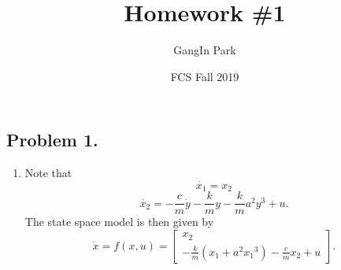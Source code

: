 \documentclass{article}
\title{Homework \#1}
\author{GangIn Park}
\date{FCS Fall 2019}
\begin{document}
\maketitle

\subsection*{Problem 1.}
    \begin{enumerate}
    \item
    Note that
    $$ \dot{x_{1}} = x_{2} $$
    $$ \dot{x_{2}} = -\frac{c}{m}\dot{y} - \frac{k}{m}y - \frac{k}{m}a^{2}y^{3} + u. $$
    The state space model is then given by
    $$ \dot{x} = f(x, u) = 
    \left[
    \begin{matrix}
    x_{2} \\
    -\frac{k}{m}(x_{1} + a^{2}{x_{1}}^{3}) - \frac{c}{m}x_{2} + u
    \end{matrix}
    \right]
    .$$
    

\end{enumerate}
\end{document}
